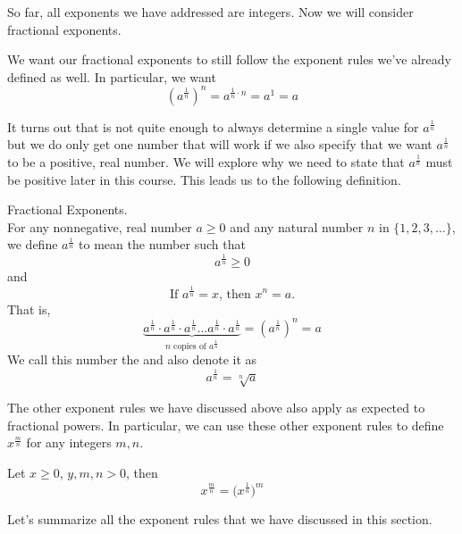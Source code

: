 \documentclass{ximera}
\begin{document}
    So far, all exponents we have addressed are integers. Now we will consider fractional exponents. 

We want our fractional exponents to still follow the exponent rules we've already defined as well.  In particular, we want
\[
\left(a^{\frac{1}{n}}\right)^n=a^{\frac{1}{n} \cdot {n}} = a^1 = a  
\]       

It turns out that is not quite enough to always determine a single value for $a^{\frac{1}{n}}$ but we do only get one number that will work if we also specify that we want  $a^{\frac{1}{n}}$ to be a positive, real number.  We will explore why we need to state that  $a^{\frac{1}{n}}$ must be positive later in this course.  This leads us to the following definition.

    \begin{definition}
    Fractional Exponents.\\
          For any nonnegative, real number $a \geq 0$ and any natural number $n$ in $\{1,2,3,\dots\}$,
          we define $a^{\frac{1}{n}}$ to mean the number such that
 $$a^{\frac{1}{n}} \geq 0$$
and
$$      
 \text{If } a^{\frac{1}{n}} = x \text{, then } x^n = a.
   $$
That is,
\[
\underbrace{a^{\frac{1}{n}} \cdot a^{\frac{1}{n}} \cdot a^{\frac{1}{n}} ... a^{\frac{1}{n}} \cdot a^{\frac{1}{n}}}_{\textrm{$n$ copies of $a^{\frac{1}{n}}$}} = \left(a^{\frac{1}{n}}\right)^n=a
\]
We call this number the  and also denote it as 
\[
a^{\frac{1}{n}} = \sqrt[n]{a}
\] 
    \end{definition}

  The other exponent rules we have discussed above also apply as expected to fractional powers. In particular, we can use these other exponent rules to define $x^{\frac{m}{n}}$ for any integers $m,n$.
  
  \begin{definition}
  Let $x\geq 0$, $y,m,n >0$, then
  $$x^{\frac{m}{n}} = \big(x^{\frac{1}{n}}\big)^m$$
 \end{definition}

Let's summarize all the exponent rules that we have discussed in this section.

\newpage
\end{document}
